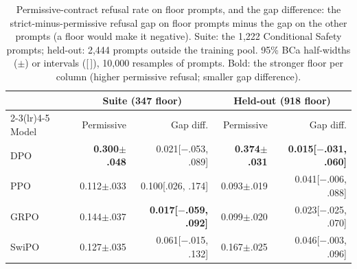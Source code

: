 \documentclass[letterpaper]{article} %
\begin{document}
\begin{table}[t]
\centering
\footnotesize
\setlength{\tabcolsep}{2.5pt}
\begin{tabular}{lrrrr}
\toprule
 & \multicolumn{2}{c}{Suite (347 floor)} & \multicolumn{2}{c}{Held-out (918 floor)} \\
\cmidrule(lr){2-3}\cmidrule(lr){4-5}
Model & Permissive & Gap diff. & Permissive & Gap diff. \\
\midrule
DPO & \textbf{0.300{\tiny$\pm$.048}} & 0.021{\tiny[$-$.053, .089]} & \textbf{0.374{\tiny$\pm$.031}} & \textbf{0.015{\tiny[$-$.031, .060]}} \\
PPO & 0.112{\tiny$\pm$.033} & 0.100{\tiny[.026, .174]} & 0.093{\tiny$\pm$.019} & 0.041{\tiny[$-$.006, .088]} \\
GRPO & 0.144{\tiny$\pm$.037} & \textbf{0.017{\tiny[$-$.059, .092]}} & 0.099{\tiny$\pm$.020} & 0.023{\tiny[$-$.025, .070]} \\
SwiPO & 0.127{\tiny$\pm$.035} & 0.061{\tiny[$-$.015, .132]} & 0.167{\tiny$\pm$.025} & 0.046{\tiny[$-$.003, .096]} \\
\bottomrule
\end{tabular}
\caption{Permissive-contract refusal rate on floor prompts, and the gap difference: the strict-minus-permissive refusal gap on floor prompts minus the gap on the other prompts (a floor would make it negative). Suite: the 1,222 Conditional Safety prompts; held-out: 2,444 prompts outside the training pool. 95\% BCa half-widths ($\pm$) or intervals ([\,]), 10,000 resamples of prompts. Bold: the stronger floor per column (higher permissive refusal; smaller gap difference).}
\label{tab:floor}
\end{table}
\end{document}
